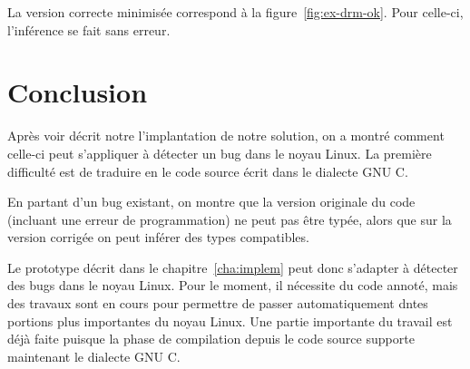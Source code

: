 La version correcte minimisée correspond à la figure~\ref{fig:ex-drm-ok}. Pour
celle-ci, l'inférence se fait sans erreur.


\section*{Conclusion}

Après voir décrit notre l'implantation de notre solution, on a montré comment
celle-ci peut s'appliquer à détecter un bug dans le noyau Linux. La première
difficulté est de traduire en \newspeak le code source écrit dans le dialecte
GNU C.

En partant d'un bug existant, on montre que la version originale du code
(incluant une erreur de programmation) ne peut pas être typée, alors que sur la
version corrigée on peut inférer des types compatibles.

Le prototype décrit dans le chapitre~\ref{cha:implem} peut donc s'adapter à
détecter des bugs dans le noyau Linux. Pour le moment, il nécessite du code
annoté, mais des travaux sont en cours pour permettre de passer automatiquement
dntes portions plus importantes du noyau Linux. Une partie importante du travail
est déjà faite puisque la phase de compilation depuis le code source supporte
maintenant le dialecte GNU C.

